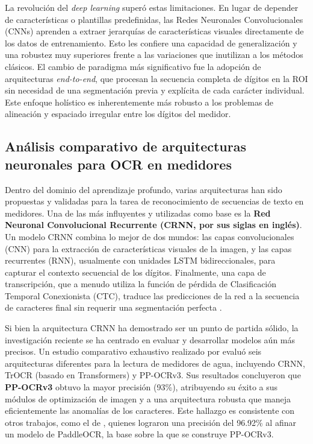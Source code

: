 La revolución del \textit{deep learning} superó estas limitaciones. En lugar de depender de características o plantillas predefinidas, las Redes Neuronales Convolucionales (CNNs) aprenden a extraer jerarquías de características visuales directamente de los datos de entrenamiento. Esto les confiere una capacidad de generalización y una robustez muy superiores frente a las variaciones que inutilizan a los métodos clásicos. El cambio de paradigma más significativo fue la adopción de arquitecturas \textit{end-to-end}, que procesan la secuencia completa de dígitos en la ROI sin necesidad de una segmentación previa y explícita de cada carácter individual. Este enfoque holístico es inherentemente más robusto a los problemas de alineación y espaciado irregular entre los dígitos del medidor.

\subsection{Análisis comparativo de arquitecturas neuronales para OCR en medidores}
\label{ssec:ocr_architectures_comparison}

Dentro del dominio del aprendizaje profundo, varias arquitecturas han sido propuestas y validadas para la tarea de reconocimiento de secuencias de texto en medidores. Una de las más influyentes y utilizadas como base es la \textbf{Red Neuronal Convolucional Recurrente (CRNN, por sus siglas en inglés)}. Un modelo CRNN combina lo mejor de dos mundos: las capas convolucionales (CNN) para la extracción de características visuales de la imagen, y las capas recurrentes (RNN), usualmente con unidades LSTM bidireccionales, para capturar el contexto secuencial de los dígitos. Finalmente, una capa de transcripción, que a menudo utiliza la función de pérdida de Clasificación Temporal Conexionista (CTC), traduce las predicciones de la red a la secuencia de caracteres final sin requerir una segmentación perfecta \parencite{Shen2023, Carvalho2023}.

Si bien la arquitectura CRNN ha demostrado ser un punto de partida sólido, la investigación reciente se ha centrado en evaluar y desarrollar modelos aún más precisos. Un estudio comparativo exhaustivo realizado por \textcite{Nguyen2025Water} evaluó seis arquitecturas diferentes para la lectura de medidores de agua, incluyendo CRNN, TrOCR (basado en Transformers) y PP-OCRv3. Sus resultados concluyeron que \textbf{PP-OCRv3} obtuvo la mayor precisión (93\%), atribuyendo su éxito a sus módulos de optimización de imagen y a una arquitectura robusta que maneja eficientemente las anomalías de los caracteres. Este hallazgo es consistente con otros trabajos, como el de \textcite{Khan2024LowCost}, quienes lograron una precisión del 96.92\% al afinar un modelo de PaddleOCR, la base sobre la que se construye PP-OCRv3.

